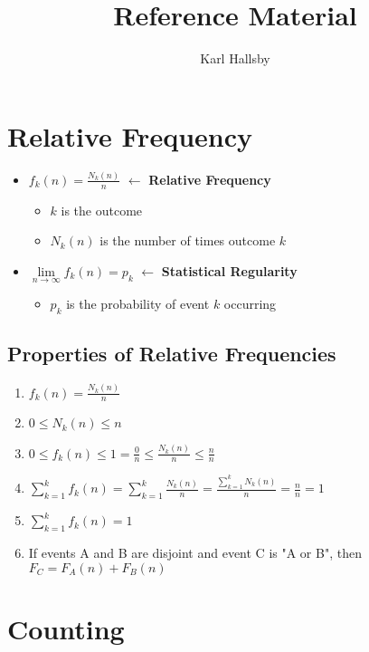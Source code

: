 \documentclass[10pt,letterpaper,final,twoside,notitlepage]{article}
\author{Karl Hallsby}
\title{Reference Material}
\theoremstyle{plain}
\theoremstyle{definition}
\theoremstyle{remark}
\begin{document}
\section{Relative Frequency} \label{sec:Relative Frequency}
\begin{itemize}[noitemsep, nolistsep]
	\item $f_k (n) = \frac{N_k (n)}{n}$ $\leftarrow$ {\large \textbf{Relative Frequency}}
	\begin{itemize}[noitemsep, nolistsep]
		\item $k$ is the outcome
		\item $N_k (n)$ is the number of times outcome $k$
	\end{itemize}
	\item $\lim\limits_{n \rightarrow \infty} f_k (n) = p_k$ $\leftarrow$ {\large \textbf{Statistical Regularity}}
	\begin{itemize}[noitemsep, nolistsep]
		\item $p_k$ is the probability of event $k$ occurring
	\end{itemize}
\end{itemize}

	\subsection{Properties of Relative Frequencies} \label {subsec:Properties Relative Frequency}
	\begin{enumerate}
		\item $f_k (n) = \frac{N_k (n)}{n}$
		\item $0 \leq N_k (n) \leq n$
		\item $0 \leq f_k (n) \leq 1 = \frac{0}{n} \leq \frac{N_k (n)}{n} \leq \frac{n}{n}$
		\item $\sum_{k=1}^{k} f_k (n) = \sum_{k=1}^{k} \frac{N_k (n)}{n} = \frac{\sum_{k=1}^{k} N_k (n)}{n} = \frac{n}{n} = 1$
		\item $\sum_{k=1}^{k} f_k (n) = 1$
		\item If events A and B are disjoint and event C is "A or B", then $F_C = F_A (n) + F_B (n)$
	\end{enumerate}





\section{Counting} \label{sec:Counting}
\end{document}
